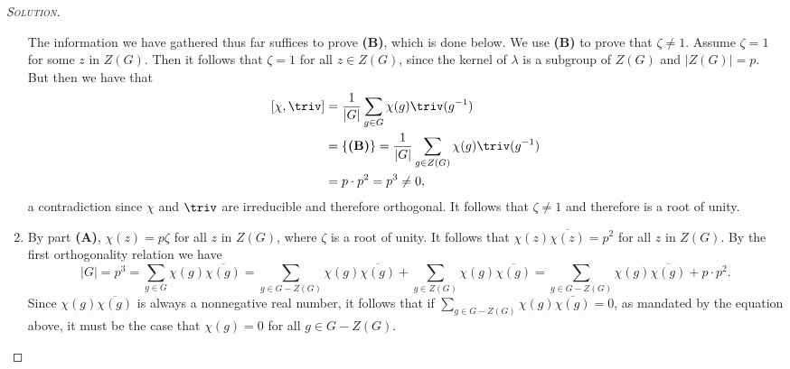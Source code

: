 \begin{proof}[{\scshape Solution}]
\begin{enumerate}[font=\normalfont,label=\textbf{(\Alph*)}, wide]
    The information we have gathered thus far suffices to prove \textbf{(B)}, which is done below. We use \textbf{(B)} to prove that $\zeta \neq 1$. Assume $\zeta = 1$ for some $z$ in $Z(G)$. Then it follows that $\zeta = 1$ for all $z \in Z(G)$, since the kernel of $\lambda$ is a subgroup of $Z(G)$ and $\lvert Z(G) \rvert = p$. But then we have that
\[
\begin{aligned}
    [\chi, \triv]
    &= \frac{1}{\lvert G \rvert}\sum_{g\in G}\chi(g)\triv(g^{-1}) \\
    &= \{\textbf{(B)}\} = \frac{1}{\lvert G \rvert}\sum_{g\in Z(G)}\chi(g)\triv(g^{-1}) \\
    &= p\cdot p^2 = p^3 \neq 0,
\end{aligned}
\]
a contradiction since $\chi$ and $\triv$ are irreducible and therefore orthogonal. It follows that $\zeta \neq 1$ and therefore is a root of unity.
\begin{comment}
     Lemma 2.15 b) and c) together state that $\chi(z) = p\zeta = \sum_i\epsilon_i$ where $\epsilon_i^p = 1$, since the order of $z$ is $p$ for all $z$ in $Z(G)$. We have that $\chi(z)^p \leq \sum_i \epsilon_i^p = $.
\end{comment}
    \item
    \begin{comment}
    By Theorem 3.8 in Isaacs, we have that if $g \in \mathcal{K}$, where $\mathcal{K}$ is some conjugacy class, and $(\chi(1), \lvert \mathcal{K}\rvert) = 1$, then either $g \in Z(\chi)$ or $\chi(g) = 0$. We have that $\chi(1) = p$. Since $g \in G-Z(g)$, it must be the case that no element in $Z(G)$ is in the conjugacy class of $g$ (since the only possibility is then that $g$ itself is contained in $Z(G)$). By the orbit-stabilizer theorem, the size of the conjugacy class of $g$ divides $\lvert G \rvert$ so in particular $\lvert K
\end{comment}
    By part \textbf{(A)}, $\chi(z) = p\zeta$ for all $z$ in $Z(G)$, where $\zeta$ is a root of unity. It follows that $\chi(z)\overline{\chi(z)}= p^2$ for all $z$ in $Z(G)$.
    By the first orthogonality relation we have
    \[
      \lvert G \rvert = p^3 = \sum_{g \in G} \chi(g)\overline{\chi(g)} = \sum_{g \in G-Z(G)}\chi(g)\overline{\chi(g)} + \sum_{g \in Z(G)}\chi(g)\overline{\chi(g)} = \sum_{g \in G-Z(G)}\chi(g)\overline{\chi(g)} + p\cdot p^2.
    \]
    Since $\chi(g)\overline{\chi(g)}$ is always a nonnegative real number, it follows that if $\sum_{g \in G-Z(G)}\chi(g)\overline{\chi(g)} = 0$, as mandated by the equation above, it must be the case that $\chi(g)=0$ for all $g\in G - Z(G)$.

\end{enumerate}
\end{proof}
